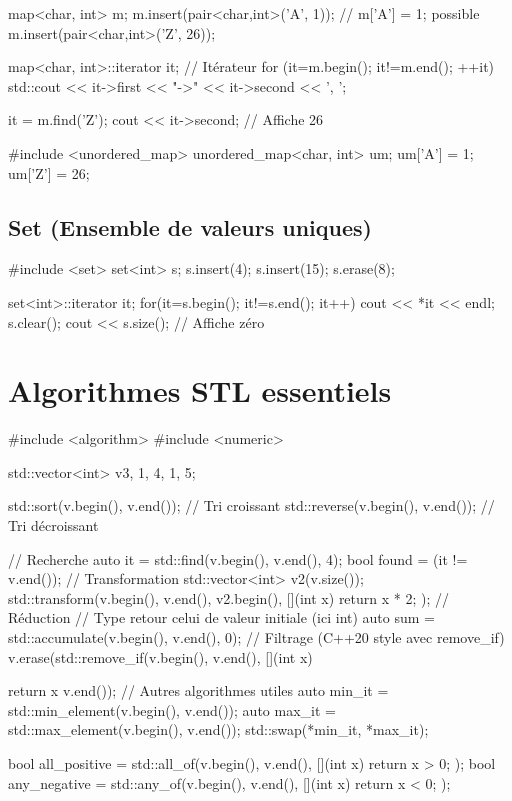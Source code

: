\documentclass{article}
\begin{document}
\begin{multicols*}{4}
\begin{cppcode}
map<char, int> m;
m.insert(pair<char,int>('A', 1)); // m['A'] = 1; possible
m.insert(pair<char,int>('Z', 26));

map<char, int>::iterator it; // Itérateur
for (it=m.begin(); it!=m.end(); ++it)
    std::cout << it->first << "->" << it->second << ', ';

it = m.find('Z');
cout << it->second; // Affiche 26

#include <unordered_map>
unordered_map<char, int> um;
um['A'] = 1; um['Z'] = 26;
\end{cppcode}

\subsection*{Set (Ensemble de valeurs uniques)}

\begin{cppcode}
#include <set>
set<int> s;
s.insert(4);
s.insert(15);
s.erase(8);

set<int>::iterator it;
for(it=s.begin(); it!=s.end(); it++) {
    cout << *it << endl; }
s.clear();
cout << s.size(); // Affiche zéro
\end{cppcode}

\section*{Algorithmes STL essentiels}

\begin{cppcode}
#include <algorithm>
#include <numeric>

std::vector<int> v{3, 1, 4, 1, 5};

std::sort(v.begin(), v.end()); // Tri croissant
std::reverse(v.begin(), v.end()); // Tri décroissant

// Recherche
auto it = std::find(v.begin(), v.end(), 4);
bool found = (it != v.end());
// Transformation
std::vector<int> v2(v.size());
std::transform(v.begin(), v.end(), v2.begin(),
               [](int x) { return x * 2; });
// Réduction
// Type retour celui de valeur initiale (ici int)
auto sum = std::accumulate(v.begin(), v.end(), 0);
// Filtrage (C++20 style avec remove_if)
v.erase(std::remove_if(v.begin(), v.end(),
                       [](int x) { return x %
        v.end());
// Autres algorithmes utiles
auto min_it = std::min_element(v.begin(), v.end());
auto max_it = std::max_element(v.begin(), v.end());
std::swap(*min_it, *max_it);

bool all_positive = std::all_of(v.begin(), v.end(),
                        [](int x) { return x > 0; });
bool any_negative = std::any_of(v.begin(), v.end(),
                        [](int x) { return x < 0; });

}
\end{cppcode}
\end{multicols*}
\end{document}

